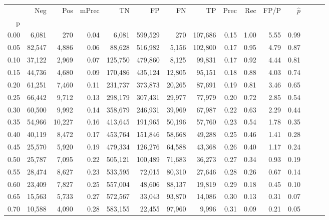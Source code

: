 \begin{tabular}{rrrrrrrrrrrrrrr}
\toprule
{} &     Neg &     Pos & mPrec &       TN &       FP &       FN &       TP &  Prec &   Rec &  FP/P & $\hat{p}$ \\
p    &         &         &       &          &          &          &          &       &       &       &           \\
\midrule
0.00 &   6,081 &     270 &  0.04 &    6,081 &  599,529 &      270 &  107,686 &  0.15 &  1.00 &  5.55 &      0.99 \\
0.05 &  82,547 &   4,886 &  0.06 &   88,628 &  516,982 &    5,156 &  102,800 &  0.17 &  0.95 &  4.79 &      0.87 \\
0.10 &  37,122 &   2,969 &  0.07 &  125,750 &  479,860 &    8,125 &   99,831 &  0.17 &  0.92 &  4.44 &      0.81 \\
0.15 &  44,736 &   4,680 &  0.09 &  170,486 &  435,124 &   12,805 &   95,151 &  0.18 &  0.88 &  4.03 &      0.74 \\
0.20 &  61,251 &   7,460 &  0.11 &  231,737 &  373,873 &   20,265 &   87,691 &  0.19 &  0.81 &  3.46 &      0.65 \\
0.25 &  66,442 &   9,712 &  0.13 &  298,179 &  307,431 &   29,977 &   77,979 &  0.20 &  0.72 &  2.85 &      0.54 \\
0.30 &  60,500 &   9,992 &  0.14 &  358,679 &  246,931 &   39,969 &   67,987 &  0.22 &  0.63 &  2.29 &      0.44 \\
0.35 &  54,966 &  10,227 &  0.16 &  413,645 &  191,965 &   50,196 &   57,760 &  0.23 &  0.54 &  1.78 &      0.35 \\
0.40 &  40,119 &   8,472 &  0.17 &  453,764 &  151,846 &   58,668 &   49,288 &  0.25 &  0.46 &  1.41 &      0.28 \\
0.45 &  25,570 &   5,920 &  0.19 &  479,334 &  126,276 &   64,588 &   43,368 &  0.26 &  0.40 &  1.17 &      0.24 \\
0.50 &  25,787 &   7,095 &  0.22 &  505,121 &  100,489 &   71,683 &   36,273 &  0.27 &  0.34 &  0.93 &      0.19 \\
0.55 &  28,474 &   8,627 &  0.23 &  533,595 &   72,015 &   80,310 &   27,646 &  0.28 &  0.26 &  0.67 &      0.14 \\
0.60 &  23,409 &   7,827 &  0.25 &  557,004 &   48,606 &   88,137 &   19,819 &  0.29 &  0.18 &  0.45 &      0.10 \\
0.65 &  15,563 &   5,733 &  0.27 &  572,567 &   33,043 &   93,870 &   14,086 &  0.30 &  0.13 &  0.31 &      0.07 \\
0.70 &  10,588 &   4,090 &  0.28 &  583,155 &   22,455 &   97,960 &    9,996 &  0.31 &  0.09 &  0.21 &      0.05 \\

\end{tabular}
